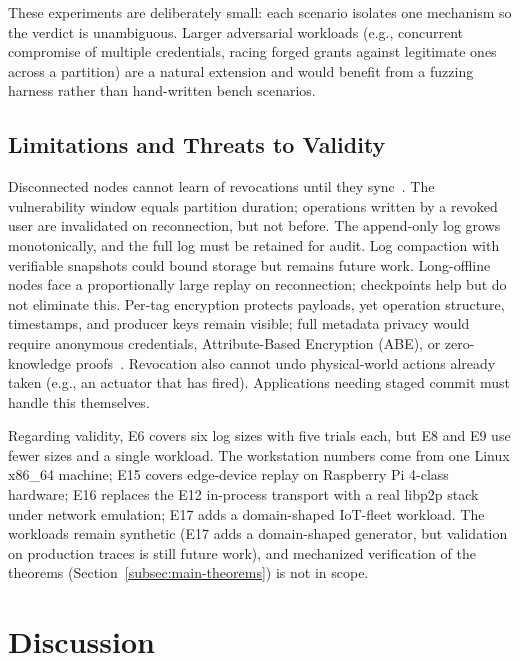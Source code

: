 \documentclass[10pt,journal,compsoc]{IEEEtran}
\begin{document}
These experiments are deliberately small: each scenario isolates one mechanism so the verdict is unambiguous. Larger adversarial workloads (e.g., concurrent compromise of multiple credentials, racing forged grants against legitimate ones across a partition) are a natural extension and would benefit from a fuzzing harness rather than hand-written bench scenarios.

\subsection{Limitations and Threats to Validity}\label{subsec:limitations}

Disconnected nodes cannot learn of revocations until they sync~\cite{10.1007/978-3-030-01950-1_48}. The vulnerability window equals partition duration; operations written by a revoked user are invalidated on reconnection, but not before. The append-only log grows monotonically, and the full log must be retained for audit. Log compaction with verifiable snapshots could bound storage but remains future work. Long-offline nodes face a proportionally large replay on reconnection; checkpoints help but do not eliminate this. Per-tag encryption protects payloads, yet operation structure, timestamps, and producer keys remain visible; full metadata privacy would require anonymous credentials, Attribute-Based Encryption (ABE), or zero-knowledge proofs~\cite{8888155,zhang2020attribute}. Revocation also cannot undo physical-world actions already taken (e.g., an actuator that has fired). Applications needing staged commit must handle this themselves.

Regarding validity, E6 covers six log sizes with five trials each, but E8 and E9 use fewer sizes and a single workload. The workstation numbers come from one Linux x86\_64 machine; E15 covers edge-device replay on Raspberry Pi 4-class hardware; E16 replaces the E12 in-process transport with a real libp2p stack under network emulation; E17 adds a domain-shaped IoT-fleet workload. The workloads remain synthetic (E17 adds a domain-shaped generator, but validation on production traces is still future work), and mechanized verification of the theorems (Section~\ref{subsec:main-theorems}) is not in scope.

\section{Discussion}
\label{sec:discussion}
\end{document}
